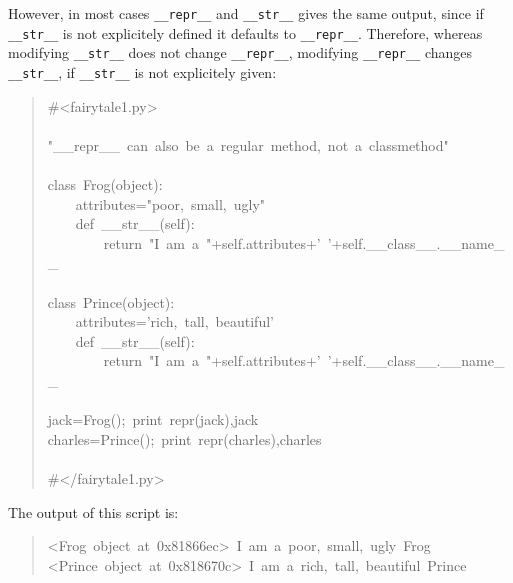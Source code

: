\documentclass[10pt,english]{article}
\begin{document}
However, in most cases \texttt{{\_}{\_}repr{\_}{\_}} and \texttt{{\_}{\_}str{\_}{\_}} gives the same
output, since if \texttt{{\_}{\_}str{\_}{\_}} is not explicitely defined it defaults
to \texttt{{\_}{\_}repr{\_}{\_}}. Therefore, whereas modifying \texttt{{\_}{\_}str{\_}{\_}} 
does not change \texttt{{\_}{\_}repr{\_}{\_}}, modifying \texttt{{\_}{\_}repr{\_}{\_}} changes \texttt{{\_}{\_}str{\_}{\_}},
if \texttt{{\_}{\_}str{\_}{\_}} is not explicitely given:
\begin{quote}
\begin{ttfamily}\begin{flushleft}
\mbox{{\#}<fairytale1.py>}\\
\mbox{}\\
\mbox{"{\_}{\_}repr{\_}{\_}~can~also~be~a~regular~method,~not~a~classmethod"}\\
\mbox{}\\
\mbox{class~Frog(object):}\\
\mbox{~~~~attributes="poor,~small,~ugly"}\\
\mbox{~~~~def~{\_}{\_}str{\_}{\_}(self):}\\
\mbox{~~~~~~~~return~"I~am~a~"+self.attributes+'~'+self.{\_}{\_}class{\_}{\_}.{\_}{\_}name{\_}{\_}}\\
\mbox{}\\
\mbox{class~Prince(object):}\\
\mbox{~~~~attributes='rich,~tall,~beautiful'}\\
\mbox{~~~~def~{\_}{\_}str{\_}{\_}(self):}\\
\mbox{~~~~~~~~return~"I~am~a~"+self.attributes+'~'+self.{\_}{\_}class{\_}{\_}.{\_}{\_}name{\_}{\_}}\\
\mbox{}\\
\mbox{jack=Frog();~print~repr(jack),jack}\\
\mbox{charles=Prince();~print~repr(charles),charles~~}\\
\mbox{}\\
\mbox{{\#}</fairytale1.py>}
\end{flushleft}\end{ttfamily}
\end{quote}

The output of this script is:
\begin{quote}
\begin{ttfamily}\begin{flushleft}
\mbox{<Frog~object~at~0x81866ec>~I~am~a~poor,~small,~ugly~Frog}\\
\mbox{<Prince~object~at~0x818670c>~I~am~a~rich,~tall,~beautiful~Prince}
\end{flushleft}\end{ttfamily}
\end{quote}
\end{document}
